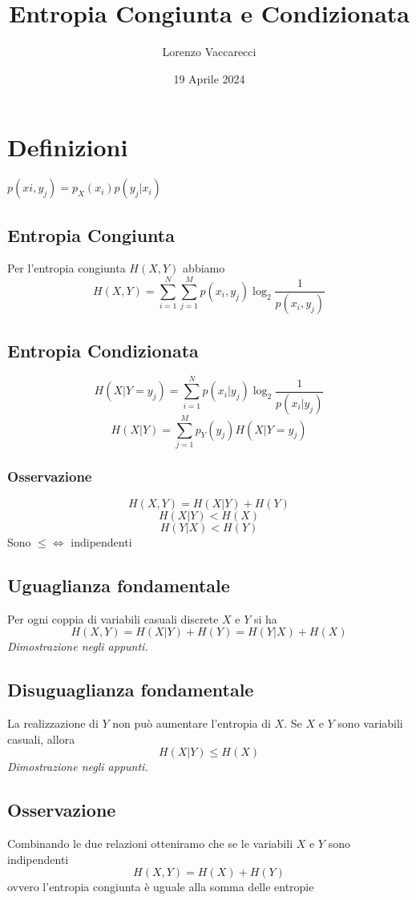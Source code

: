 \documentclass[12pt]{article}
\title{Entropia Congiunta e Condizionata}
\author{Lorenzo Vaccarecci}
\date{19 Aprile 2024}
\begin{document}
\maketitle
\section{Definizioni}
$p(x{i},y_{j})=p_{X}(x_{i})p(y_{j}|x_{i})$
\subsection{Entropia Congiunta}
Per l'entropia congiunta $H(X,Y)$ abbiamo
\begin{equation*}
    H(X,Y)=\sum_{i=1}^{N}\sum_{j=1}^{M}p(x_{i},y_{j})\log_{2}\frac{1}{p(x_{i},y_{j})}
\end{equation*}
\subsection{Entropia Condizionata}
\begin{equation*}
    H(X|Y=y_{j})=\sum_{i=1}^{N}p(x_{i}|y_{j})\log_{2}\frac{1}{p(x_{i}|y_{j})}
\end{equation*}
\begin{equation*}
    H(X|Y)=\sum_{j=1}^{M}p_{Y}(y_{j})H(X|Y=y_{j})
\end{equation*}
\subsubsection{Osservazione}
\begin{equation*}
    H(X,Y)=H(X|Y)+H(Y)
\end{equation*}
\begin{equation*}
    H(X|Y)<H(X)
\end{equation*}
\begin{equation*}
    H(Y|X)<H(Y)
\end{equation*}
Sono $\leq \iff$ indipendenti
\subsection{Uguaglianza fondamentale}
Per ogni coppia di variabili casuali discrete $X$ e $Y$ si ha
\begin{equation*}
    H(X,Y)=H(X|Y)+H(Y)=H(Y|X)+H(X)
\end{equation*}
\textit{Dimostrazione negli appunti.}
\subsection{Disuguaglianza fondamentale}
La realizzazione di $Y$ non può aumentare l'entropia di $X$. Se $X$ e  $Y$ sono variabili casuali, allora
\begin{equation*}
    H(X|Y)\leq H(X)
\end{equation*}
\textit{Dimostrazione negli appunti.}
\subsection{Osservazione}
Combinando le due relazioni otteniramo che se le variabili $X$ e $Y$ sono indipendenti
\begin{equation*}
    H(X,Y)=H(X)+H(Y)
\end{equation*}
ovvero l'entropia congiunta è uguale alla somma delle entropie
\end{document}
